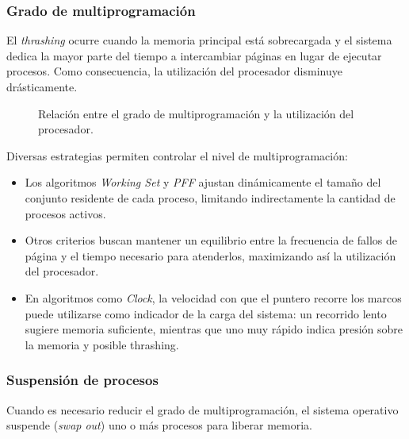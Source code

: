 \subsubsection{Grado de multiprogramación}

El \textit{thrashing} ocurre cuando la memoria principal está sobrecargada y el sistema dedica la mayor parte del tiempo a intercambiar páginas en lugar de ejecutar procesos. Como consecuencia, la utilización del procesador disminuye drásticamente.

\begin{figure}[!ht]
  \centering
  \caption{Relación entre el grado de multiprogramación y la utilización del procesador.}
\end{figure}

Diversas estrategias permiten controlar el nivel de multiprogramación:
\begin{itemize}
  \item Los algoritmos \textit{Working Set} y \textit{PFF} ajustan dinámicamente el tamaño del conjunto residente de cada proceso, limitando indirectamente la cantidad de procesos activos.
  \item Otros criterios buscan mantener un equilibrio entre la frecuencia de fallos de página y el tiempo necesario para atenderlos, maximizando así la utilización del procesador.
  \item En algoritmos como \textit{Clock}, la velocidad con que el puntero recorre los marcos puede utilizarse como indicador de la carga del sistema: un recorrido lento sugiere memoria suficiente, mientras que uno muy rápido indica presión sobre la memoria y posible thrashing.
\end{itemize}

\subsubsection{Suspensión de procesos}

Cuando es necesario reducir el grado de multiprogramación, el sistema operativo suspende (\textit{swap out}) uno o más procesos para liberar memoria.

